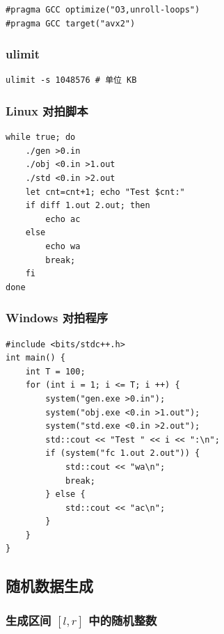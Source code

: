 \documentclass{article}
\begin{document}
\begin{verbatim}
#pragma GCC optimize("O3,unroll-loops")
#pragma GCC target("avx2")
\end{verbatim}

\subsubsection{ulimit}

\begin{verbatim}
ulimit -s 1048576 # 单位 KB
\end{verbatim}

\subsubsection{Linux 对拍脚本}

\begin{verbatim}
while true; do
    ./gen >0.in
    ./obj <0.in >1.out
    ./std <0.in >2.out
    let cnt=cnt+1; echo "Test $cnt:"
    if diff 1.out 2.out; then
        echo ac
    else
        echo wa
        break;
    fi
done
\end{verbatim}

\subsubsection{Windows 对拍程序}

\begin{verbatim}
#include <bits/stdc++.h>
int main() {
    int T = 100;
    for (int i = 1; i <= T; i ++) {
        system("gen.exe >0.in");
        system("obj.exe <0.in >1.out");
        system("std.exe <0.in >2.out");
        std::cout << "Test " << i << ":\n";
        if (system("fc 1.out 2.out")) {
            std::cout << "wa\n";
            break;
        } else {
            std::cout << "ac\n";
        }
    }
}
\end{verbatim}

\subsection{随机数据生成}

\subsubsection{生成区间 $[l,r]$ 中的随机整数}

\end{document}
